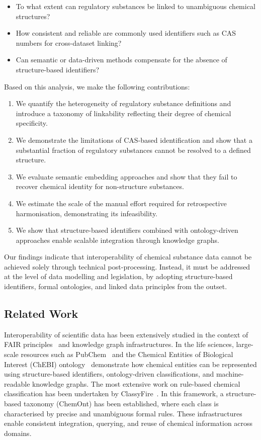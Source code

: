 \begin{itemize}
	\item To what extent can regulatory substances be linked to unambiguous chemical structures?
	\item How consistent and reliable are commonly used identifiers such as CAS numbers for cross-dataset linking?
	\item Can semantic or data-driven methods compensate for the absence of structure-based identifiers?
\end{itemize}

Based on this analysis, we make the following contributions:
\begin{enumerate}
	\item We quantify the heterogeneity of regulatory substance definitions and introduce a taxonomy of linkability reflecting their degree of chemical specificity.
	\item We demonstrate the limitations of CAS-based identification and show that a substantial fraction of regulatory substances cannot be resolved to a defined structure.
	\item We evaluate semantic embedding approaches and show that they fail to recover chemical identity for non-structure substances.
	\item We estimate the scale of the manual effort required for retrospective harmonisation, demonstrating its infeasibility.
	\item We show that structure-based identifiers combined with ontology-driven approaches enable scalable integration through knowledge graphs.
\end{enumerate}

Our findings indicate that interoperability of chemical substance data cannot be achieved solely through technical post-processing. Instead, it must be addressed at the level of data modelling and legislation, by adopting structure-based identifiers, formal ontologies, and linked data principles from the outset.

\subsection{Related Work}
\label{sec:related_work}

Interoperability of scientific data has been extensively studied in the context of FAIR principles~\cite{Wilkinson2016} and knowledge graph infrastructures. In the life sciences, large-scale resources such as PubChem~\cite{Kim2015} and the Chemical Entities of Biological Interest (ChEBI) ontology~\cite{Degtyarenko2008} demonstrate how chemical entities can be represented using structure-based identifiers, ontology-driven classifications, and machine-readable knowledge graphs. The most extensive work on rule-based chemical classification has been undertaken by ClassyFire~\cite{DjoumbouFeunang2016}. In this framework, a structure-based taxonomy (ChemOnt) has been established, where each class is characterised by precise and unambiguous formal rules. These infrastructures enable consistent integration, querying, and reuse of chemical information across domains.

